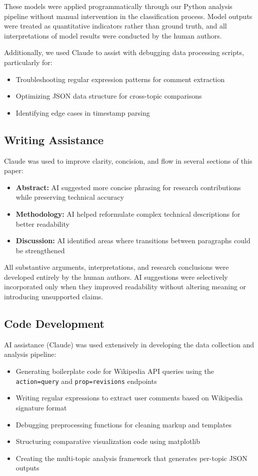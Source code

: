 These models were applied programmatically through our Python analysis pipeline without manual intervention in the classification process. Model outputs were treated as quantitative indicators rather than ground truth, and all interpretations of model results were conducted by the human authors.

Additionally, we used Claude to assist with debugging data processing scripts, particularly for:
\begin{itemize}
    \item Troubleshooting regular expression patterns for comment extraction
    \item Optimizing JSON data structure for cross-topic comparisons
    \item Identifying edge cases in timestamp parsing
\end{itemize}

\subsection{Writing Assistance}

Claude was used to improve clarity, concision, and flow in several sections of this paper:

\begin{itemize}
    \item \textbf{Abstract:} AI suggested more concise phrasing for research contributions while preserving technical accuracy
    \item \textbf{Methodology:} AI helped reformulate complex technical descriptions for better readability
    \item \textbf{Discussion:} AI identified areas where transitions between paragraphs could be strengthened
\end{itemize}

All substantive arguments, interpretations, and research conclusions were developed entirely by the human authors. AI suggestions were selectively incorporated only when they improved readability without altering meaning or introducing unsupported claims.

\subsection{Code Development}

AI assistance (Claude) was used extensively in developing the data collection and analysis pipeline:

\begin{itemize}
    \item Generating boilerplate code for Wikipedia API queries using the \texttt{action=query} and \texttt{prop=revisions} endpoints
    \item Writing regular expressions to extract user comments based on Wikipedia signature format
    \item Debugging preprocessing functions for cleaning markup and templates
    \item Structuring comparative visualization code using matplotlib
    \item Creating the multi-topic analysis framework that generates per-topic JSON outputs
\end{itemize}

